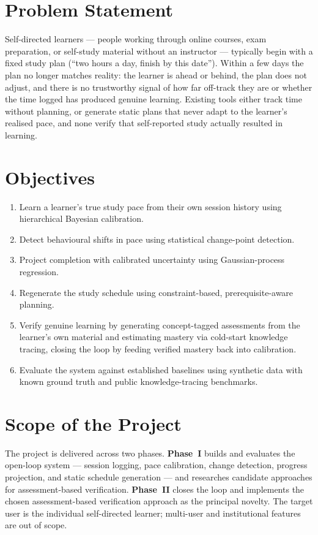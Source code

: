 \documentclass[12pt]{report}
\begin{document}
\section{Problem Statement}
Self-directed learners --- people working through online courses, exam preparation, or
self-study material without an instructor --- typically begin with a fixed study plan
(``two hours a day, finish by this date''). Within a few days the plan no longer matches
reality: the learner is ahead or behind, the plan does not adjust, and there is no
trustworthy signal of how far off-track they are or whether the time logged has produced
genuine learning. Existing tools either track time without planning, or generate static
plans that never adapt to the learner's realised pace, and none verify that self-reported
study actually resulted in learning.

\section{Objectives}
\begin{enumerate}[noitemsep]
    \item Learn a learner's true study pace from their own session history using
    hierarchical Bayesian calibration.
    \item Detect behavioural shifts in pace using statistical change-point detection.
    \item Project completion with calibrated uncertainty using Gaussian-process regression.
    \item Regenerate the study schedule using constraint-based, prerequisite-aware planning.
    \item Verify genuine learning by generating concept-tagged assessments from the
    learner's own material and estimating mastery via cold-start knowledge tracing,
    closing the loop by feeding verified mastery back into calibration.
    \item Evaluate the system against established baselines using synthetic data with
    known ground truth and public knowledge-tracing benchmarks.
\end{enumerate}

\section{Scope of the Project}
The project is delivered across two phases. \textbf{Phase~I} builds and evaluates the
open-loop system --- session logging, pace calibration, change detection, progress
projection, and static schedule generation --- and researches candidate approaches for
assessment-based verification. \textbf{Phase~II} closes the loop and implements the
chosen assessment-based verification approach as the principal novelty. The target user
is the individual self-directed learner; multi-user and institutional features are out of
scope.
\end{document}
